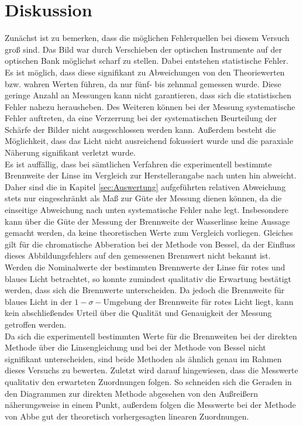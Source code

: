 \section{Diskussion}
\label{sec:Diskussion}
Zunächst ist zu bemerken, dass die möglichen Fehlerquellen bei diesem Versuch groß sind.
Das Bild war durch Verschieben der optischen Instrumente auf der optischen Bank möglichst
scharf zu stellen. Dabei entstehen statistische Fehler. Es ist möglich, dass diese
signifikant zu Abweichungen von den Theoriewerten bzw. wahren Werten führen, da nur fünf-
bis zehnmal gemessen wurde. Diese geringe Anzahl an Messungen kann nicht
garantieren, dass sich die statistischen Fehler nahezu herausheben. Des Weiteren können
bei der Messung systematische Fehler auftreten, da eine Verzerrung bei der systematischen
Beurteilung der Schärfe der Bilder nicht ausgeschlossen werden kann. Außerdem besteht die
Möglichkeit, dass das Licht nicht ausreichend fokussiert wurde und die paraxiale Näherung
signifikant verletzt wurde.\\
Es ist auffällig, dass bei sämtlichen Verfahren die experimentell bestimmte Brennweite der Linse im Vergleich
zur Herstellerangabe nach unten hin abweicht. Daher sind die in Kapitel \ref{sec:Auswertung}
aufgeführten relativen Abweichung stets nur eingeschränkt als Maß zur Güte der Messung
dienen können, da die einseitige Abweichung nach unten systematische Fehler nahe legt.
Insbesondere kann über die Güte der Messung der Brennweite der Wasserlinse keine
Aussage gemacht werden, da keine theoretischen Werte zum Vergleich vorliegen.
Gleiches gilt für die chromatische Abberation bei der Methode von Bessel, da der Einfluss
dieses Abbildungsfehlers auf den gemessenen Brennwert nicht bekannt ist. Werden
die Nominalwerte der bestimmten Brennwerte der Linse für rotes und blaues Licht betrachtet,
so konnte zumindest qualitativ die Erwartung bestätigt werden, dass sich die Brennwerte
unterscheiden. Da jedoch die Brennweite für blaues Licht in der $1-\sigma-\text{Umgebung}$
der Brennweite für rotes Licht liegt, kann kein abschließendes Urteil über die
Qualität und Genauigkeit der Messung getroffen werden. \\
Da sich die experimentell bestimmten Werte für die Brennweiten bei der direkten Methode
über die Linsengleichung und bei der Methode von Bessel nicht signifikant unterscheiden,
sind beide Methoden als ähnlich genau im Rahmen dieses Versuchs zu bewerten.
Zuletzt wird darauf hingewiesen, dass die Messwerte qualitativ den erwarteten Zuordnungen
folgen. So schneiden sich die Geraden in den Diagrammen zur direkten Methode abgesehen
von den Außreißern näherungsweise in einem Punkt, außerdem folgen die Messwerte bei der
Methode von Abbe gut der theoretisch vorhergesagten linearen Zuordnungen.
